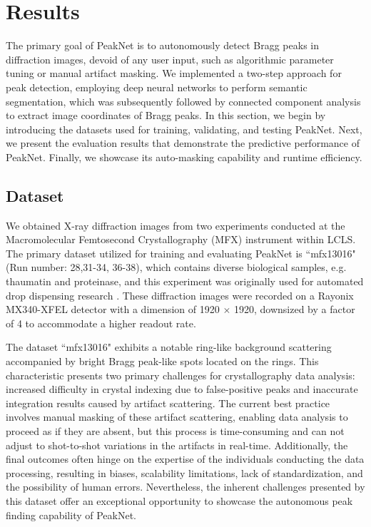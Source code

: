 \documentclass[a4paper]{article}
\newcommand{\peaknet}{PeakNet}
\begin{document}
\section{Results}

The primary goal of \peaknet{} is to autonomously detect Bragg peaks in diffraction images, devoid of any user input, such as algorithmic parameter tuning or manual artifact masking.  We implemented a two-step approach for peak detection, employing deep neural networks to perform semantic segmentation, which was subsequently followed by connected component analysis to extract image coordinates of Bragg peaks.  In this section, we begin by introducing the datasets used for training, validating, and testing \peaknet{}. Next, we present the evaluation results that demonstrate the predictive performance of \peaknet{}. Finally, we showcase its auto-masking capability and runtime efficiency.


\subsection{Dataset}

We obtained X-ray diffraction images from two experiments conducted at the Macromolecular Femtosecond Crystallography (MFX) instrument within LCLS.  The primary dataset utilized for training and evaluating \peaknet{} is ``mfx13016" (Run number: 28,31-34, 36-38), which contains diverse biological samples, e.g.  thaumatin and proteinase, and this experiment was originally used for automated drop dispensing research \citep{suSerialCrystallographyUsing2021}.  These diffraction images were recorded on a Rayonix MX340-XFEL detector with a dimension of 1920 $\times$ 1920, downsized by a factor of 4 to accommodate a higher readout rate.  

The dataset ``mfx13016" exhibits a notable ring-like background scattering accompanied by bright Bragg peak-like spots located on the rings.  This characteristic presents two primary challenges for crystallography data analysis: increased difficulty in crystal indexing due to false-positive peaks and inaccurate integration results caused by artifact scattering.  The current best practice involves manual masking of these artifact scattering, enabling data analysis to proceed as if they are absent, but this process is time-consuming and can not adjust to shot-to-shot variations in the artifacts in real-time.  Additionally, the final outcomes often hinge on the expertise of the individuals conducting the data processing, resulting in biases, scalability limitations, lack of standardization, and the possibility of human errors.  Nevertheless, the inherent challenges presented by this dataset offer an exceptional opportunity to showcase the autonomous peak finding capability of \peaknet{}.
\end{document}

